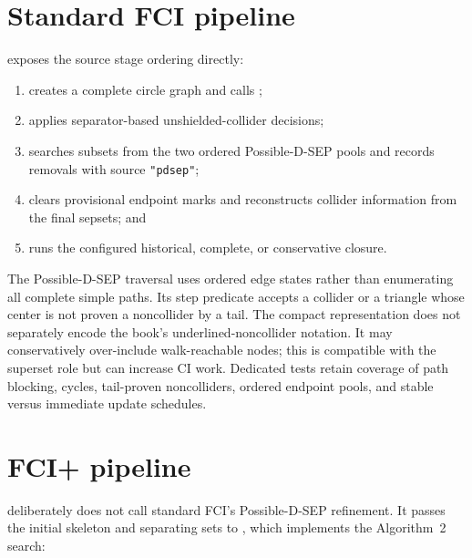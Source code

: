 \documentclass[11pt,a4paper,oneside]{report}
\newcommand{\code}[1]{\texttt{#1}}
\begin{document}
\section{Standard FCI pipeline}

 exposes the source stage ordering directly:

\begin{enumerate}[leftmargin=2em]
  \item {} creates a complete circle graph and
        calls ;
  \item {} applies separator-based unshielded-collider
        decisions;
  \item {} searches subsets from the two ordered
        Possible-D-SEP pools and records removals with source
        \code{"pdsep"};
  \item {} clears provisional endpoint
        marks and reconstructs collider information from the final sepsets;
        and
  \item {} runs the configured historical,
        complete, or conservative closure.
\end{enumerate}

The Possible-D-SEP traversal uses ordered edge states rather than enumerating
all complete simple paths.  Its step predicate accepts a collider or a
triangle whose center is not proven a noncollider by a tail.  The compact
representation does not separately encode the book's underlined-noncollider
notation.  It may conservatively over-include walk-reachable nodes; this is
compatible with the superset role but can increase CI work.  Dedicated tests
retain coverage of path blocking, cycles, tail-proven noncolliders, ordered
endpoint pools, and stable versus immediate update schedules.

\section{FCI+ pipeline}

 deliberately does not call standard
FCI's Possible-D-SEP refinement.  It passes the initial skeleton and
separating sets to
, which implements the Algorithm~2
search:
\end{document}
